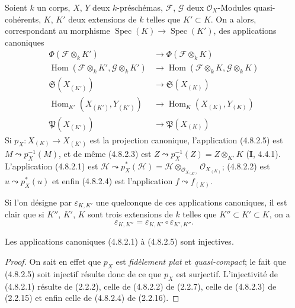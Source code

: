 \begin{env}[4.8.2]
\label{IV.2.4.8.2-fr}
Soient $k$ un corps, $X$, $Y$ deux $k$-préschémas, $\mathscr F$, $\mathscr G$
deux $\mathcal O_X$-Modules quasi-cohérents, $K$, $K'$ deux extensions de $k$
telles que $K'\subset K$. On a alors, correspondant au morphisme
$\operatorname{Spec}(K)\to\operatorname{Spec}(K')$, des applications
canoniques
\begin{align}
\Phi(\mathscr F\otimes_kK')
&\longrightarrow\Phi(\mathscr F\otimes_kK)
\tag{4.8.2.1}
\label{IV.2.4.8.2.1-fr}\\
\operatorname{Hom}(\mathscr F\otimes_kK',\mathscr G\otimes_kK')
&\longrightarrow
\operatorname{Hom}(\mathscr F\otimes_kK,\mathscr G\otimes_kK)
\tag{4.8.2.2}
\label{IV.2.4.8.2.2-fr}\\
\mathfrak S(X_{(K')})&\longrightarrow\mathfrak S(X_{(K)})
\tag{4.8.2.3}
\label{IV.2.4.8.2.3-fr}\\
\operatorname{Hom}_{K'}(X_{(K')},Y_{(K')})
&\longrightarrow\operatorname{Hom}_K(X_{(K)},Y_{(K)})
\tag{4.8.2.4}
\label{IV.2.4.8.2.4-fr}\\
\mathfrak P(X_{(K')})&\longrightarrow\mathfrak P(X_{(K)})
\tag{4.8.2.5}
\label{IV.2.4.8.2.5-fr}
\end{align}
Si $p_X:X_{(K)}\to X_{(K')}$ est la projection canonique, l'application
(4.8.2.5) est $M\leadsto p_X^{-1}(M)$, et de même (4.8.2.3) est
$Z\leadsto p_X^{-1}(Z)=Z\otimes_{K'}K$ (\textbf{I}, 4.4.1). L'application (4.8.2.1)
est
$\mathscr H\leadsto p_X^*(\mathscr H)
=\mathscr H\otimes_{\mathcal O_{X_{(K')}}}\mathcal O_{X_{(K)}}$;
(4.8.2.2) est $u\leadsto p_X^*(u)$ et enfin (4.8.2.4) est l'application
$f\leadsto f_{(K)}$.

Si l'on désigne par $\varepsilon_{K,K'}$ une quelconque de ces applications
canoniques, il est clair que si $K''$, $K'$, $K$ sont trois extensions de $k$
telles que $K''\subset K'\subset K$, on a
\begin{equation}
\varepsilon_{K,K''}=\varepsilon_{K,K'}\circ\varepsilon_{K',K''}.
\tag{4.8.2.6}
\label{IV.2.4.8.2.6-fr}
\end{equation}
\end{env}


\begin{proposition}[4.8.3]
\label{IV.2.4.8.3-fr}
Les applications canoniques \textup{(4.8.2.1)} à \textup{(4.8.2.5)} sont injectives.
\end{proposition}

\begin{proof}
On sait en effet que $p_X$ est \emph{fidèlement plat} et \emph{quasi-compact}; le fait que
(4.8.2.5) soit injectif résulte donc de ce que $p_X$ est surjectif.
L'injectivité de (4.8.2.1) résulte de (2.2.2), celle de (4.8.2.2) de (2.2.7),
celle de (4.8.2.3) de (2.2.15) et enfin celle de (4.8.2.4) de (2.2.16).
\end{proof}

